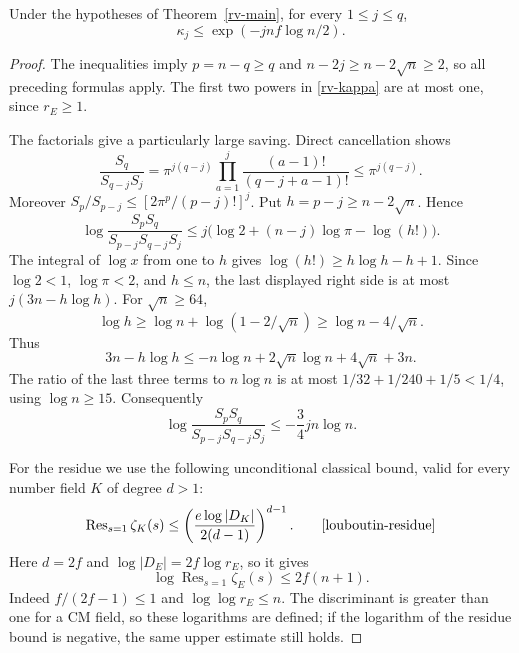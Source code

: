 \begin{lemma}\label{rv-kappa-bound}
Under the hypotheses of Theorem~\ref{rv-main},
for every $1\le j\le q$,
\begin{equation}\label{rv-kappa-small}
                 \kappa_j\le
                    \exp(-jnf\log n/2).
\end{equation}
\end{lemma}
\begin{proof}
The inequalities imply $p=n-q\ge q$ and
$n-2j\ge n-2\sqrt n\ge2$, so all preceding formulas
apply.  The first two powers in \eqref{rv-kappa}
are at most one, since $r_E\ge1$.

The factorials give a particularly large saving.
Direct cancellation shows
\[
 \frac{S_q}{S_{q-j}S_j}
   =\pi^{j(q-j)}
          \prod_{a=1}^{j}\frac{(a-1)!}{(q-j+a-1)!}
   \le\pi^{j(q-j)}.
\]
Moreover
$S_p/S_{p-j}\le[2\pi^p/(p-j)!]^j$.
Put $h=p-j\ge n-2\sqrt n$.  Hence
\[
 \log\frac{S_pS_q}{S_{p-j}S_{q-j}S_j}
       \le j\bigl(\log2+(n-j)\log\pi-\log(h!)\bigr).
\]
The integral of $\log x$ from one to $h$ gives
$\log(h!)\ge h\log h-h+1$.
Since $\log2<1$, $\log\pi<2$, and $h\le n$,
the last displayed right side is at most
$j(3n-h\log h)$.
For $\sqrt n\ge64$,
\[
 \log h\ge\log n+\log(1-2/\sqrt n)
                          \ge\log n-4/\sqrt n .
\]
Thus
\[
 3n-h\log h
 \le -n\log n+2\sqrt n\log n+4\sqrt n+3n .
\]
The ratio of the last three terms to $n\log n$
is at most
$1/32+1/240+1/5<1/4$, using $\log n\ge15$.
Consequently
\begin{equation}\label{rv-sphere-saving}
 \log\frac{S_pS_q}{S_{p-j}S_{q-j}S_j}
                         \le-\frac34jn\log n.
\end{equation}

For the residue we use the following unconditional
classical bound, valid for every number field $K$
of degree $d>1$:
\[
 \operatorname{Res}_{s=1}\zeta_K(s)
       \le\left(\frac{e\log|D_K|}{2(d-1)}\right)^{d-1}.
 \qquad\text{\cite[Theorem 1(1)]{louboutin-residue}}
\]
Here $d=2f$ and $\log|D_E|=2f\log r_E$, so it gives
\begin{equation}\label{rv-residue-bound}
       \log\operatorname{Res}_{s=1}\zeta_E(s)
                           \le 2f(n+1).
\end{equation}
Indeed $f/(2f-1)\le1$ and
$\log\log r_E\le n$.  The discriminant is greater
than one for a CM field, so these logarithms are
defined; if the logarithm of the residue bound is
negative, the same upper estimate still holds.


\end{proof}
